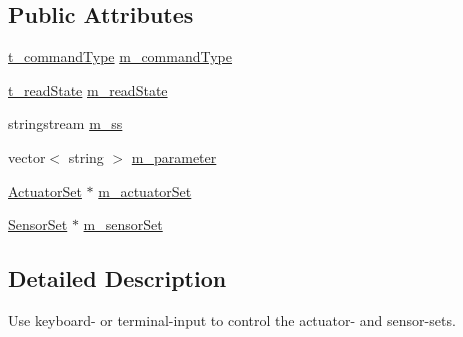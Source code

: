 \subsection*{Public Attributes}
\begin{DoxyCompactItemize}
\item 
\hyperlink{classCommandSequenceInterpreter_a96f5e5d9fa213d5e6a9bb0e3fb7fabd8}{t\-\_\-command\-Type} \hyperlink{classCommandSequenceInterpreter_a67f17cd12035c3177dec4ad7199dff09}{m\-\_\-command\-Type}
\item 
\hyperlink{classCommandSequenceInterpreter_a651640c84d800a896ccd8291a93128a0}{t\-\_\-read\-State} \hyperlink{classCommandSequenceInterpreter_ac230cd37bfd33ff720a04142ba9b13fc}{m\-\_\-read\-State}
\item 
stringstream \hyperlink{classCommandSequenceInterpreter_af00adda23c01ffa7092ac6c8304de4fd}{m\-\_\-ss}
\item 
vector$<$ string $>$ \hyperlink{classCommandSequenceInterpreter_acd419ae2ac997f8b8c59003b5e2c4a32}{m\-\_\-parameter}
\item 
\hyperlink{classActuatorSet}{Actuator\-Set} $\ast$ \hyperlink{classCommandSequenceInterpreter_aab92295e940532f6175327d6a03e7d67}{m\-\_\-actuator\-Set}
\item 
\hyperlink{classSensorSet}{Sensor\-Set} $\ast$ \hyperlink{classCommandSequenceInterpreter_ad0c5aa0524c53759ec691efebcca5233}{m\-\_\-sensor\-Set}
\end{DoxyCompactItemize}


\subsection{Detailed Description}
Use keyboard-\/ or terminal-\/input to control the actuator-\/ and sensor-\/sets. 

